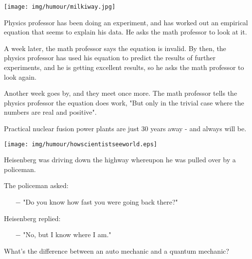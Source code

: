 	\begin{center}
	\texttt{[image: img/humour/milkiway.jpg]}
	\end{center}
\begin{center}\underline{\hspace{5 cm}}\end{center}

Physics professor has been doing an experiment, and has worked out an empirical equation that seems to explain his data. He asks the math professor to look at it. 

A week later, the math professor says the equation is invalid. By then, the physics professor has used his equation to predict the results of further experiments, and he is getting excellent results, so he asks the math professor to look again. 

Another week goes by, and they meet once more. The math professor tells the physics professor the equation does work, "But only in the trivial case where the numbers are real and positive".
\begin{center}\underline{\hspace{5 cm}}\end{center}

Practical nuclear fusion power plants are just 30 years away - and always will be.
	
	\pagebreak
	\begin{center}
	\texttt{[image: img/humour/howscientistseeworld.eps]}
	\end{center}
	
	\pagebreak
	
	Heisenberg was driving down the highway whereupon he was pulled over by a policeman. 

	The policeman asked:
	
	\begin{itemize}	 
		\item[$-$] "Do you know how fast you were going back there?"
	\end{itemize}
	
	Heisenberg replied: 
	
	\begin{itemize}	 
		\item[$-$] "No, but I know where I am."
	\end{itemize}
	\begin{center}\underline{\hspace{5 cm}}\end{center}
	
	What's the difference between an auto mechanic and a quantum mechanic?
	
